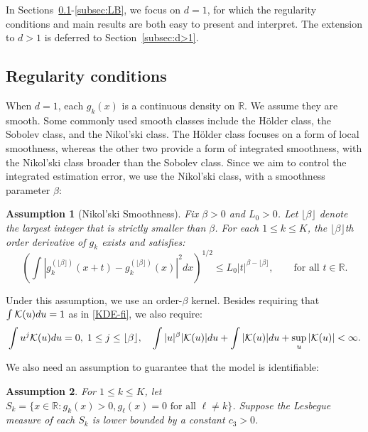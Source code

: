 \documentclass[preprint,11pt]{article}
\newtheorem{assumption}{Assumption}
\def\r#1{\textcolor{red}{\bf #1}}
\newcommand{\mcal}{\mathcal}
\numberwithin{equation}{section}
\newcommand{\beq}{\begin{equation}}
\newcommand{\eeq}{\end{equation}}
\begin{document}
In Sections~\ref{subsec:reg-cond}-\ref{subsec:LB}, we focus on $d=1$, for which the regularity conditions and main results are both easy to present and interpret. The extension to $d>1$ is deferred to Section~\ref{subsec:d>1}. 

\subsection{Regularity conditions} \label{subsec:reg-cond}

When $d=1$, each $g_k(x)$ is a continuous density on $\mathbb{R}$. 
We assume they are smooth. 
Some commonly used smooth classes include the H\"{o}lder class, the Sobolev class, and the Nikol’ski class. 
The H\"{o}lder class focuses on a form of local smoothness, whereas the other two provide a form of integrated smoothness, with the Nikol’ski class broader than the Sobolev class.
Since we aim to control the integrated estimation error, we use the Nikol'ski class, with a smoothness parameter $\beta$: 


\begin{assumption}[Nikol'ski  Smoothness]\label{assump1}
Fix $\beta > 0$ and $L_0>0$. Let $\lfloor\beta\rfloor$ denote the largest integer that is strictly smaller than $\beta$. For each $1\leq k\leq K$, the  $\lfloor\beta\rfloor$th order derivative of $g_k$ exists and satisfies:
  \[
  \left( \int \left| g_k^{(\lfloor\beta\rfloor)}(x + t) - g_k^{(\lfloor\beta\rfloor)}(x) \right|^2 dx \right)^{1/2} \le L_0 |t|^{\beta - \lfloor\beta\rfloor},\qquad\mbox{for all $t\in\mathbb{R}$}.
  \]
\end{assumption}
Under this assumption, we use an order-$\beta$ kernel. 
Besides requiring that $\int {\cal K}(u)du=1$ as in \eqref{KDE-fi}, we also require:
\beq \label{cond-kernel}
\int u^j {\cal K}(u)du=0, \; 1\leq j\leq \lfloor \beta\rfloor, \quad  \int |u|^\beta |{\cal K}(u)|du +  \int |\mcal{K}(u)|du + \sup_u|\mcal{K}(u)| <\infty. 
\eeq



We also need an assumption to guarantee that the model is identifiable:
\begin{assumption}\label{assump-anchor}
For $1\leq k\leq K$, let $S_k=\{x\in\mathbb{R}: g_k(x)>0, g_\ell(x)=0 \mbox{ for all $\ell\neq k$}\}$. Suppose the Lesbegue measure of each $S_k$ is lower bounded by a constant $c_3>0$.  
\end{assumption}
\end{document}
